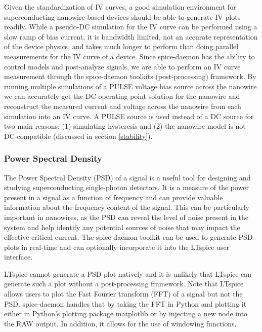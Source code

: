 \documentclass[]{article}
\newcommand{\todo}[2][]{}
\newcommand{\cf}[1]{\textsf{#1}}
\begin{document}
Given the standardization of IV curves, a good simulation environment for superconducting nanowire based devices
should be able to generate IV plots readily. While a pseudo-DC simulation for the IV curve can be performed
using a slow ramp of bias current, it is bandwidth limited, not an accurate representation of the device physics, 
and takes much longer to perform than doing parallel measurements for the IV curve of a device. Since spice-daemon
has the ability to control models and post-analyze signals, we are able to perform an IV curve measurement through
the spice-daemon toolkits (post-processing) framework. By running multiple simulations of a PULSE voltage bias source across the nanowire
we can accurately get the DC operating point solution for the nanowire and reconstruct the measured current and voltage
across the nanowire from each simulation into an IV curve. A PULSE source is used instead of a DC 
source for two main reasons: (1) 
simulating hysteresis and (2) the nanowire model is not DC-compatible (discussed in section \ref{stability}).

\todo[inline]{example of IV curve obtained from sd}

\subsubsection{Power Spectral Density}

The Power Spectral Density (PSD) of a signal is a useful tool for designing and studying
superconducting single-photon detectors. It is a 
measure of the power present in a signal as a function of frequency and can provide valuable information about 
the frequency content of the signal. This can be particularly important in nanowires, 
as the PSD can reveal the level of noise present in the system and help identify any 
potential sources of noise that may impact the effective critical current. 
The spice-daemon toolkit can be used to generate PSD plots in real-time and can 
optionally incorporate it into the LTspice user interface.

LTspice cannot generate a PSD plot natively and it is unlikely that LTspice
 can generate such a plot without a post-processing framework.
Note that LTspice allows users to plot the Fast Fourier transform (FFT) of a signal but not the 
PSD. spice-daemon handles that by taking the FFT in Python and plotting it either in Python's 
plotting package \cf{matplotlib} or by injecting a new node into the RAW output. In addition,
it allows for the use of windowing functions.
\end{document}
